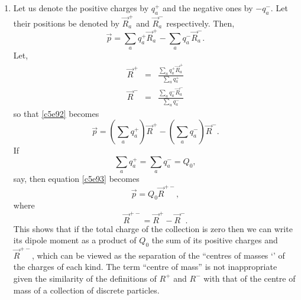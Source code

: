 \begin{enumerate}
\item Let us denote the positive charges by $q_a^+$ and the negative ones by
$-q_a^-$. Let their positions be denoted by $\vec{R}_a^+$ and $\vec{R}_a^-$
respectively. Then,
\begin{equation}\label{c5e92}
\vec{p} =  \sum_a q_a^+\vec{R}_a^+ - \sum_a q_a^-\vec{R}_a^-.
\end{equation}
Let,
\begin{eqnarray*}
\vec{R}^+ &=& \frac{\sum_a q_a^+\vec{R}_a^+}{\sum_a q_a^+} \\
\vec{R}^- &=& \frac{\sum_a q_a^-\vec{R}_a^-}{\sum_a q_a^-}
\end{eqnarray*}
so that \eqref{c5e92} becomes
\begin{equation}\label{c5e93}
\vec{p} = \left(\sum_a q_a^+\right)\vec{R}^+ - \left(\sum_a q_a^-\right)\vec{R}^-.
\end{equation}
If
\begin{equation}\label{c5e94}
\sum_a q_a^+ = \sum_a q_a^- = Q_0,
\end{equation}
say, then equation \eqref{c5e93} becomes
\begin{equation}\label{c5e95}
\vec{p} = Q_0\vec{R}^{+-},
\end{equation}
where
\begin{equation}\label{c5e96}
\vec{R}^{+-} = \vec{R}^+ - \vec{R}^-.
\end{equation}
This shows that if the total charge of the collection is zero then we can write 
its dipole moment as a product of $Q_0$ the sum of its positive charges and 
$\vec{R}^{+-}$, which can be viewed as the separation of the ``centres of masses
`' of the charges of each kind. The term ``centre of mass'' is not inappropriate
given the similarity of the definitions of $R^+$ and $R^-$ with that of the centre
of mass of a collection of discrete particles.


\end{enumerate}
